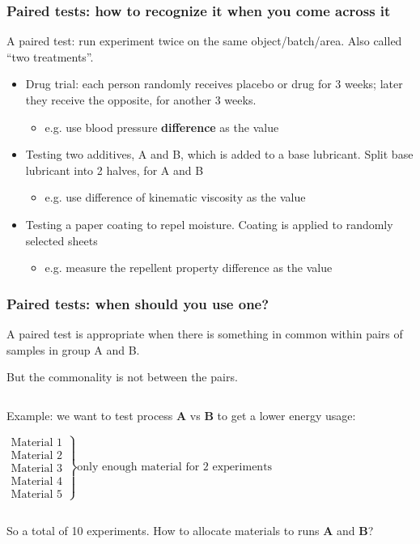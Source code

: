 \begin{frame}\frametitle{Paired tests: how to recognize it when you come across it}

	A paired test: run experiment twice on the same object/batch/area. Also called ``two treatments''.
	\begin{itemize}
		\item	Drug trial: each person randomly receives placebo or drug for 3 weeks; later they receive the opposite, for another 3 weeks.
		\begin{itemize}
			\item	e.g. use blood pressure \textbf{difference} as the value
		\end{itemize}
		\item	Testing two additives, A and B, which is added to a base lubricant. Split base lubricant into 2 halves, for A and B
		\begin{itemize}
			\item	e.g. use difference of kinematic viscosity as the value
		\end{itemize}
		\item	Testing a paper coating to repel moisture. Coating is applied to randomly selected sheets
		\begin{itemize}
			\item	e.g. measure the repellent property difference as the value
		\end{itemize}
	\end{itemize}
\end{frame}

\begin{frame}\frametitle{Paired tests: when should you use one?}

	A paired test is appropriate when there is something in common within pairs of samples in group A and B.

	But the commonality is not between the pairs.

	$\qquad$

	Example: we want to test process \textbf{A} vs \textbf{B} to get a lower energy usage:

	$ \left.
	\begin{array}{r}
		\text{Material 1}\\
		\text{Material 2}\\
		\text{Material 3}\\
		\text{Material 4}\\
		\text{Material 5}
	\end{array}
	\right\} \text{only enough material for 2 experiments} $

	$\qquad$

	So a total of 10 experiments. How to allocate materials to runs \textbf{A} and \textbf{B}?
\end{frame}

